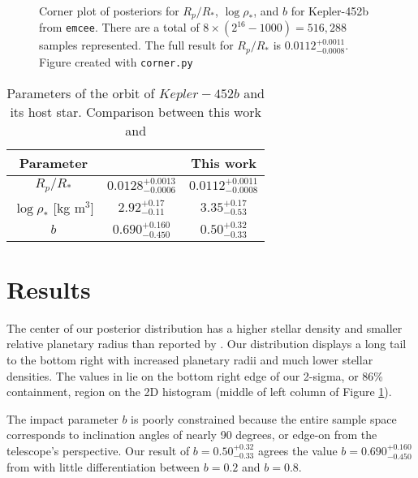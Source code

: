 \documentclass[modern]{aastex631}
\begin{document}
\begin{figure}[!ht]
    \caption{Corner plot of posteriors for $R_p / R_\ast$, $\log \rho_\ast$, and $b$ for Kepler-452b from \texttt{emcee}. There are a total of $8 \times (2^{16} - 1000) = 516,288$ samples represented. The full result for $R_p / R_\ast$ is $0.0112^{+0.0011}_{-0.0008}$. Figure created with \texttt{corner.py} \citep{corner}}
    \label{fig:corner}
\end{figure}

\begin{table}[!ht]
    \centering
    \begin{tabular}{|c|c|c|}
    \hline
    Parameter &\citet{jenkinsDISCOVERYVALIDATIONKepler452b2015} &This work  \\
         \hline
         $R_p / R_\ast$ & $0.0128^{+0.0013}_{-0.0006}$ &  $0.0112^{+0.0011}_{-0.0008}$ \\
         $\log \rho_\ast$ [kg m$^3$] & $2.92^{+0.17}_{-0.11}$ & $3.35^{+0.17}_{-0.53}$ \\
         $b$ & $0.690^{+0.160}_{-0.450}$ & $0.50^{+0.32}_{-0.33}$\\
         \hline
    \end{tabular}
    \caption{Parameters of the orbit of $Kepler-452b$ and its host star. Comparison between this work and \citet{jenkinsDISCOVERYVALIDATIONKepler452b2015}}
    \label{tab:tabl}
\end{table}

\section{Results}

The center of our posterior distribution has a higher stellar density and smaller relative planetary radius than reported by \citet{jenkinsDISCOVERYVALIDATIONKepler452b2015}. Our distribution displays a long tail to the bottom right with increased planetary radii and much lower stellar densities. The values in \citet{jenkinsDISCOVERYVALIDATIONKepler452b2015} lie on the bottom right edge of our 2-sigma, or 86\% containment, region on the 2D histogram (middle of left column of Figure \ref{fig:corner}).

The impact parameter $b$ is poorly constrained because the entire sample space corresponds to inclination angles of nearly 90 degrees, or edge-on from the telescope's perspective. Our result of $b = 0.50^{+0.32}_{-0.33}$ agrees the value $b = 0.690^{+0.160}_{-0.450}$ from \citet{jenkinsDISCOVERYVALIDATIONKepler452b2015} with little differentiation between $b = 0.2$ and $b = 0.8$.
\end{document}
